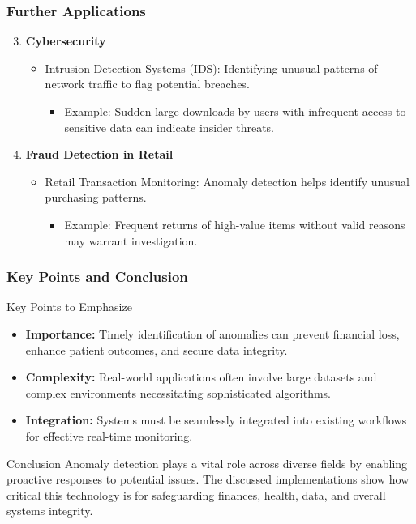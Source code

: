 \documentclass{beamer}
\begin{document}
\begin{frame}[fragile]
    \frametitle{Further Applications}

    \begin{enumerate}    
        \setcounter{enumi}{2}
        \item \textbf{Cybersecurity}
        \begin{itemize}
            \item Intrusion Detection Systems (IDS): Identifying unusual patterns of network traffic to flag potential breaches.
            \begin{itemize}
                \item Example: Sudden large downloads by users with infrequent access to sensitive data can indicate insider threats.
            \end{itemize}
        \end{itemize}

        \item \textbf{Fraud Detection in Retail}
        \begin{itemize}
            \item Retail Transaction Monitoring: Anomaly detection helps identify unusual purchasing patterns.
            \begin{itemize}
                \item Example: Frequent returns of high-value items without valid reasons may warrant investigation.
            \end{itemize}
        \end{itemize}
    \end{enumerate}
\end{frame}

\begin{frame}[fragile]
    \frametitle{Key Points and Conclusion}

    \begin{block}{Key Points to Emphasize}
        \begin{itemize}
            \item \textbf{Importance:} Timely identification of anomalies can prevent financial loss, enhance patient outcomes, and secure data integrity.
            \item \textbf{Complexity:} Real-world applications often involve large datasets and complex environments necessitating sophisticated algorithms.
            \item \textbf{Integration:} Systems must be seamlessly integrated into existing workflows for effective real-time monitoring.
        \end{itemize}
    \end{block}

    \begin{block}{Conclusion}
        Anomaly detection plays a vital role across diverse fields by enabling proactive responses to potential issues. The discussed implementations show how critical this technology is for safeguarding finances, health, data, and overall systems integrity.
    \end{block}
\end{frame}
\end{document}
